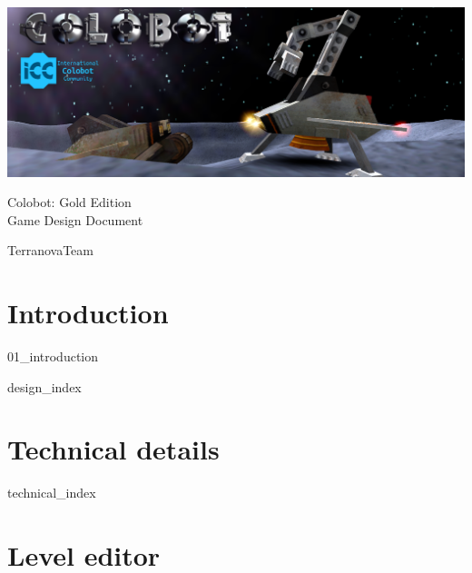\documentclass[12pt]{report}
\begin{document}

\begin{titlepage}
\begin{center}

\vspace*{5cm}

\includegraphics[width=\textwidth]{resources/intro-image}

\vspace{3cm}

{ \Huge Colobot: Gold Edition\\[0.75cm] Game Design Document }

\vspace{1.5cm}

{ \Large TerranovaTeam }

\end{center}
\end{titlepage}

\tableofcontents{}
\newpage

\listoftodos
\newpage


\part{Introduction} \newpage
{01_introduction}
\newpage

{design_index}

\part{Technical details} \newpage
{technical_index}
\newpage

\part{Level editor} \newpage
{}
\newpage

\end{document}
